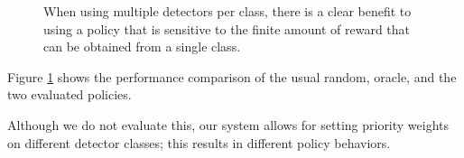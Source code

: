 \begin{figure}[htb]
  \caption{\label{fig:2det} When using multiple detectors per class, there is a clear benefit to using a policy that is sensitive to the finite amount of reward that can be obtained from a single class.}
\end{figure}

Figure \ref{fig:2det} shows the performance comparison of the usual random, oracle, and the two evaluated policies.

Although we do not evaluate this, our system allows for setting priority weights on different detector classes; this results in different policy behaviors.
